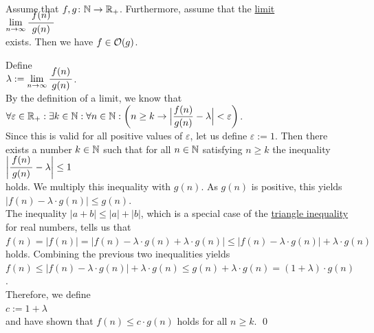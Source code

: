 \begin{Proposition}  \label{limit}
  Assume that $f,g \colon {\mathbb N} \rightarrow {{\mathbb R}_+}$.   Furthermore, assume that the
  \href{https://en.wikipedia.org/wiki/Limit_of_a_sequence}{limit} 
  \\[0.4cm]
  \hspace*{1.3cm}
 $\lim\limits_{n \rightarrow \infty} \bruch{\,f(n)\,}{g(n)}$
  \\[0.2cm]
  exists.  Then we have $f \in \mathcal{O}(g)$. 
\end{Proposition}

\proof
Define \\[0.2cm]
\hspace*{1.3cm}
$\lambda := \lim\limits_{n \rightarrow \infty} \bruch{f(n)}{g(n)}$.  
\\[0.2cm]
By the definition of a limit, we know that
\\[0.2cm]
\hspace*{1.3cm}
$\displaystyle\forall \varepsilon \in \mathbb{R}_+:\exists k \in \mathbb{N}: \forall n \in \mathbb{N}: 
 \biggl(n \geq k \rightarrow \Bigl| \frac{f(n)}{g(n)} - \lambda \Bigr| < \varepsilon \biggr)
$.
\\[0.2cm]
Since this is valid for all positive values of $\varepsilon$, let us define $\varepsilon := 1$. 
Then there exists a number $k \in {\mathbb N}$ such that
for all $n\in {\mathbb N}$ satisfying $n \geq k$ the inequality 
\\[0.2cm]
\hspace*{1.3cm}
$\left| \bruch{f(n)}{g(n)} - \lambda \right| \leq 1$ 
\\[0.2cm]
holds.  We multiply this inequality with $g(n)$.  As $g(n)$ is positive, this yields
\\[0.2cm]
\hspace*{1.3cm}
$|f(n) - \lambda \cdot g(n)| \leq g(n)$. 
\\[0.2cm]
The inequality $|a + b| \leq |a| + |b|$, which is a special case of the
\href{https://en.wikipedia.org/wiki/Triangle_inequality}{triangle inequality} for
real numbers, tells us that  
\\[0.2cm]
\hspace*{1.3cm}
$f(n) =    \bigl|f(n)\bigr|
      =    \bigl|f(n) - \lambda \cdot g(n) + \lambda \cdot g(n)\bigr|
      \leq \bigl|f(n) - \lambda \cdot g(n)\bigr| + \lambda \cdot g(n)$ 
\\[0.2cm]
holds.  Combining the previous two inequalities yields
\\[0.2cm]
\hspace*{1.3cm}
$f(n) \leq \bigl|f(n) - \lambda \cdot g(n)\bigr| + \lambda \cdot g(n)
      \leq g(n) + \lambda \cdot g(n)
       =   (1 + \lambda) \cdot g(n)
$.
\\[0.2cm]
Therefore, we define
\\[0.2cm]
\hspace*{1.3cm}
 $c := 1 +  \lambda$
\\[0.2cm] 
and have shown that $f(n) \leq c \cdot g(n)$ holds for all $n \geq k$. \qed
\vspace*{0.3cm}

